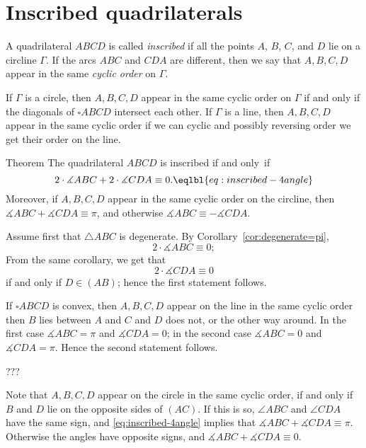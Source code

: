 \section*{Inscribed quadrilaterals}

A quadrilateral $ABCD$ is called 
\emph{inscribed}
if all the points $A$, $B$, $C$, and $D$ lie on a circline $\Gamma$.
If the arcs $ABC$ and $CDA$ are different, then we say that $A,B,C,D$ appear in the same \emph{cyclic order} on $\Gamma$.

If $\Gamma$ is a circle, then $A,B,C,D$ appear in the same cyclic order on $\Gamma$ if and only if the diagonals of $\square ABCD$ intersect each other.
If $\Gamma$ is a line, then $A,B,C,D$ appear in the same cyclic order if we can cyclic and possibly reversing order we get their order on the line.

\begin{thm}{Theorem}\label{thm:inscribed-quadrilateral}
The quadrilateral $ABCD$ is inscribed 
if and only~if
$$2\cdot\measuredangle ABC+2\cdot\measuredangle CDA\equiv 0.
\eqlbl{eq:inscribed-4angle}$$
Moreover, if $A,B,C,D$ appear in the same cyclic order on the circline, then 
$\measuredangle ABC+\measuredangle CDA
\equiv 
\pi$, and otherwise 
$\measuredangle ABC
\equiv
-\measuredangle CDA$.

\end{thm}


Assume first that $\triangle ABC$ is degenerate.
By Corollary~\ref{cor:degenerate=pi},
$$2\cdot \measuredangle ABC\equiv 0;$$
From the same corollary, we get that
$$2\cdot \measuredangle CDA\equiv 0$$ 
if and only if $D\in (AB)$;
hence the first statement follows.

If $\square ABCD$ is convex, then $A,B,C,D$ appear on the line in the same cyclic order then $B$ lies between $A$ and $C$ and $D$ does not, or the other way around.
In the first case $\measuredangle ABC=\pi$ and $\measuredangle CDA= 0$;
in the second case $\measuredangle ABC=0$ and $\measuredangle CDA=\pi$.
Hence the second statement follows.

???

Note that $A,B,C,D$ appear on the circle in the same cyclic order,
if and only if $B$ and $D$ lie on the opposite sides of $(AC)$.
If this is so, $\angle ABC$ and $\angle CDA$ have the same sign, and \ref{eq:inscribed-4angle} implies that $\measuredangle ABC+\measuredangle CDA
\equiv 
\pi$. 
Otherwise the angles have opposite signs, and  $\measuredangle ABC+\measuredangle CDA
\equiv 
0$.
\qeds





















